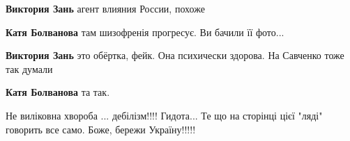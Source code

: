 \begin{itemize}
\begin{itemize}
\textbf{Виктория Зань} агент влияния России, похоже


\textbf{Катя Болванова} там шизофренія прогресує. Ви бачили її фото...


\textbf{Виктория Зань} это обёртка, фейк. Она психически здорова. На Савченко тоже так думали


\textbf{Катя Болванова} та так.
\end{itemize}



Не виліковна хвороба ... дебілізм!!!! Гидота... Те що на сторінці цієї "ляді"
говорить все само. Боже, бережи Україну!!!!!

\end{itemize}

